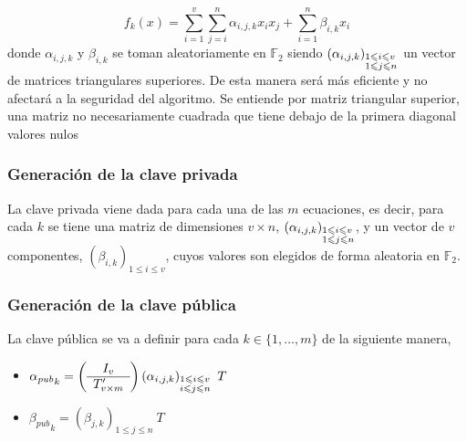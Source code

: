 \begin{equation}\label{eq:fun}
f_k(x) = \sum_{i=1}^v \sum_{j=i}^n \alpha_{i,j,k} x_i x_j + \sum_{i=1}^n \beta_{i,k} x_i
\end{equation}
donde $\alpha_{i,j,k}$ y $\beta_{i,k}$ se toman aleatoriamente en $\mathds{F}_2$ siendo $\left(\alpha_{i,j,k}\right)_{\begin{subarray}{l}{1\leqslant i \leqslant v }\\ {1 \leqslant j \leqslant n}\end{subarray}}$ un vector de matrices triangulares superiores. De esta manera será más eficiente y no afectará a la seguridad del algoritmo. Se entiende por matriz triangular superior, una matriz no necesariamente cuadrada que tiene debajo de la primera diagonal valores nulos



\subsubsection{Generación de la clave privada}
La clave privada viene dada para cada una de las $m$ ecuaciones, es decir, para cada $k$ se tiene una matriz de dimensiones $v \times n$, $\left(\alpha_{i,j,k}\right)_{\begin{subarray}{l}{1\leqslant i \leqslant v }\\ {1 \leqslant j \leqslant n}\end{subarray}}$, y un vector de $v$ componentes, $\left(\beta_{i,k}\right)_{1\leqslant i \leqslant v }$, cuyos valores son elegidos de forma aleatoria en $\mathds{F}_2$.


\subsubsection{Generación de la clave pública}
La clave pública se va a definir para cada $k\in \{1, \dots, m\}$ de la siguiente manera, 

\begin{itemize}
	\item ${\alpha_{pub}}_k = \left(
	\begin{array}{c}
	I_v \\
	\hline
	T'_{v \times m}
	\end{array}
	\right) \left(\alpha_{i,j,k}\right)_{\begin{subarray}{l}{1 \leqslant i\leqslant v }\\ {i\leqslant j \leqslant n}\end{subarray}} \ T$
	
	\item ${\beta_{pub}}_k = \left(\beta_{j,k}\right)_{1\leqslant j\leqslant n}\ T$
\end{itemize}

